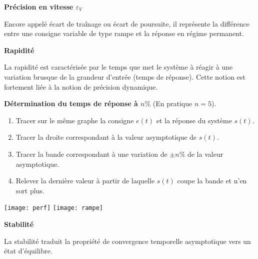 \begin{defi}\textbf{Précision en vitesse $\varepsilon_V$}

Encore appelé écart de traînage ou écart de poursuite, il représente la différence entre une consigne variable de type rampe et la réponse en régime permanent. 
\end{defi}

\begin{defi}\textbf{Rapidité}

La rapidité est caractérisée par le temps que met le système à réagir à une
variation brusque de la grandeur d'entrée (temps de réponse). Cette notion est
fortement liée à la notion de précision dynamique.
\end{defi}

\begin{methode}\textbf{Détermination du temps de réponse à $n\%$} (En pratique $n=5$).\\

\begin{enumerate}
 \item Tracer sur le même graphe la consigne $e(t)$ et la réponse du système
$s(t)$.
\item Tracer la droite correspondant à la valeur asymptotique de $s(t)$.
\item Tracer la bande correspondant à une variation de $\pm n\%$ de la valeur
asymptotique.
\item Relever la dernière valeur à partir de laquelle $s(t)$ coupe la bande et
n'en sort plus.
\end{enumerate}
\end{methode}


\begin{center}
%
\texttt{[image: perf]}
\hfill
%
\texttt{[image: rampe]}
\end{center}

\begin{defi}\textbf{Stabilité}

La stabilité traduit la propriété de convergence temporelle asymptotique vers
un état d'équilibre. 
\end{defi}



